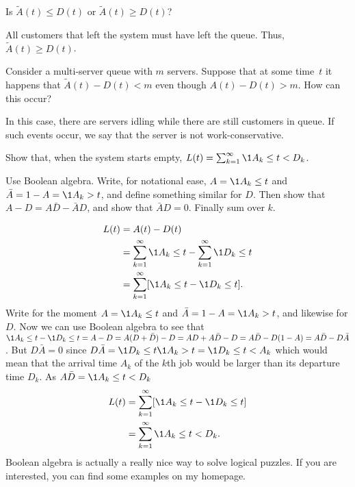 \begin{extra}
 Is $\tilde A(t) \leq D(t)$ or $\tilde A(t) \geq D(t)$?
\begin{solution}
 All customers that left the system must have left the
 queue. Thus, $\tilde A(t) \geq D(t)$.
\end{solution}
\end{extra}



\begin{extra}
 Consider a multi-server queue with $m$ servers.
 Suppose that at some time~$t$ it happens that $\tilde A(t) - D(t) < m$ even though $A(t) - D(t) > m$.
 How can this occur?
\begin{solution}
 In this case, there are servers idling while there are still
 customers in queue. If such events occur, we say that the server
 is not work-conservative.
\end{solution}
\end{extra}


\begin{exercise}
 Show that, when the system starts empty, $L(t) = \sum_{k=1}^\infty \1{A_k \leq t < D_k}$.
\begin{hint}
 Use Boolean algebra.
 Write, for notational ease, $A=\1{A_k \leq t}$ and $\bar A = 1- A = \1{A_k > t}$, and define something similar for $D$.
 Then show that $A - D = A \bar D - \bar A D$, and show that $\bar A D =0$.
 Finally sum over $k$.
\end{hint}

\begin{solution}
 \begin{equation*}
 \begin{split}
 L(t)
&= A(t) - D(t) \\
&= \sum_{k=1}^\infty \1{A_k \leq t} - \sum_{k=1}^\infty \1{D_k \leq t} \\
&= \sum_{k=1}^\infty [\1{A_k \leq t} - \1{D_k \leq t}].
 \end{split}
 \end{equation*}
 Write for the moment $A=\1{A_k \leq t}$ and
 $\bar A = 1- A = \1{A_k > t}$, and likewise for $D$. Now we can use
 Boolean algebra to see that
 $\1{A_k \leq t} - \1{D_k \leq t} = A-D = A(D+\bar D) -D = AD +
 A\bar D - D = A\bar D - D(1-A) = A\bar D - D \bar A$.
 But $D \bar A = 0$ since
 $D \bar A = \1{D_k \leq t} \1{A_k > t} = \1{D_k \leq t < A_k}$
 which would mean that the arrival time $A_k$ of the $k$th job would
 be larger than its departure time $D_k$. As $A \bar D = \1{A_k \leq t < D_k}$
 \begin{equation*}
 \begin{split}
 L(t)
&= \sum_{k=1}^\infty [\1{A_k \leq t} - \1{D_k \leq t}] \\
&= \sum_{k=1}^\infty \1{A_k \leq t < D_k}.
 \end{split}
 \end{equation*}
 Boolean algebra is actually a really nice way to solve logical puzzles.
 If you are interested, you can find some examples on my homepage.
\end{solution}

\end{exercise}

